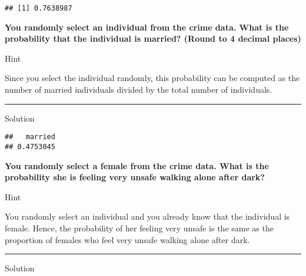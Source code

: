 \documentclass[
]{book}
\newenvironment{Shaded}{\begin{snugshade}}{\end{snugshade}}
\newcommand{\CommentTok}[1]{\textcolor[rgb]{0.56,0.35,0.01}{\textit{#1}}}
\newcommand{\DecValTok}[1]{\textcolor[rgb]{0.00,0.00,0.81}{#1}}
\newcommand{\FunctionTok}[1]{\textcolor[rgb]{0.13,0.29,0.53}{\textbf{#1}}}
\newcommand{\NormalTok}[1]{#1}
\newcommand{\OtherTok}[1]{\textcolor[rgb]{0.56,0.35,0.01}{#1}}
\newcommand{\SpecialCharTok}[1]{\textcolor[rgb]{0.81,0.36,0.00}{\textbf{#1}}}
\begin{document}
\begin{verbatim}
## [1] 0.7638987
\end{verbatim}

\textbf{You randomly select an individual from the crime data. What is the probability that the individual is married? (Round to 4 decimal places)}

Hint

Since you select the individual randomly, this probability can be computed as the number of married individuals divided by the total number of individuals.

\begin{center}\rule{0.5\linewidth}{0.5pt}\end{center}

Solution

\begin{Shaded}
\end{Shaded}

\begin{verbatim}
##   married 
## 0.4753045
\end{verbatim}

\textbf{You randomly select a female from the crime data. What is the probability she is feeling very unsafe walking alone after dark?}

Hint

You randomly select an individual and you already know that the individual is female. Hence, the probability of her feeling very unsafe is the same as the proportion of females who feel very unsafe walking alone after dark.

\begin{center}\rule{0.5\linewidth}{0.5pt}\end{center}

Solution

\begin{Shaded}
\end{Shaded}
\end{document}
